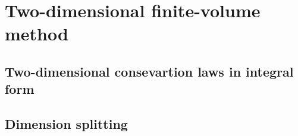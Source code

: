 
\chapter{Two-dimensional finite-volume method}
\label{chp2-2d-fv}

\section{Two-dimensional consevartion laws in integral form}
\label{chp2-sec1}

\section{Dimension splitting}
\label{chp2-sec2}


